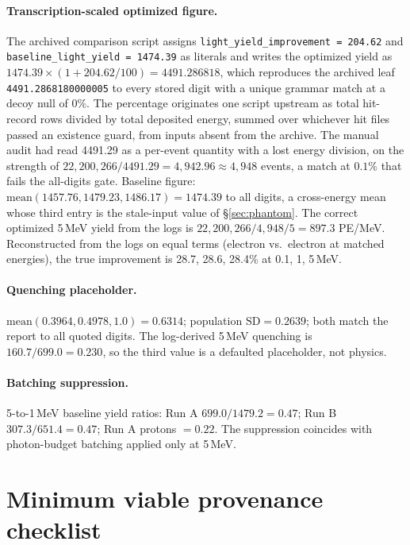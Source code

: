 \documentclass{article}
\begin{document}
\paragraph{Transcription-scaled optimized figure.} The archived comparison script assigns \texttt{light\_yield\_improvement = 204.62} and \texttt{baseline\_light\_yield = 1474.39} as literals and writes the optimized yield as $1474.39 \times (1 + 204.62/100) = 4491.286818$, which reproduces the archived leaf \texttt{4491.2868180000005} to every stored digit with a unique grammar match at a decoy null of 0\%. The percentage originates one script upstream as total hit-record rows divided by total deposited energy, summed over whichever hit files passed an existence guard, from inputs absent from the archive. The manual audit had read 4491.29 as a per-event quantity with a lost energy division, on the strength of $22{,}200{,}266 / 4491.29 = 4{,}942.96 \approx 4{,}948$ events, a match at $0.1\%$ that fails the all-digits gate. Baseline figure: $\mathrm{mean}(1457.76, 1479.23, 1486.17) = 1474.39$ to all digits, a cross-energy mean whose third entry is the stale-input value of \S\ref{sec:phantom}. The correct optimized 5\,MeV yield from the logs is $22{,}200{,}266 / 4{,}948 / 5 = 897.3$ PE/MeV. Reconstructed from the logs on equal terms (electron vs.\ electron at matched energies), the true improvement is 28.7, 28.6, 28.4\% at 0.1, 1, 5\,MeV.

\paragraph{Quenching placeholder.} $\mathrm{mean}(0.3964, 0.4978, 1.0) = 0.6314$; population $\mathrm{SD} = 0.2639$; both match the report to all quoted digits. The log-derived 5\,MeV quenching is $160.7/699.0 = 0.230$, so the third value is a defaulted placeholder, not physics.

\paragraph{Batching suppression.} 5-to-1\,MeV baseline yield ratios: Run A $699.0/1479.2 = 0.47$; Run B $307.3/651.4 = 0.47$; Run A protons $= 0.22$. The suppression coincides with photon-budget batching applied only at 5\,MeV.

\section{Minimum viable provenance checklist}
\label{app:checklist}
\end{document}
